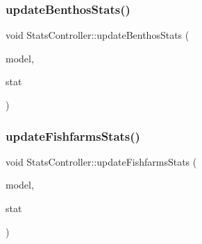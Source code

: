\mbox{\label{class_stats_controller_ab43599a0bbe242b5e4bc4bc3edaeaf58}} 
\subsubsection{\texorpdfstring{updateBenthosStats()}{updateBenthosStats()}}
{\footnotesize\ttfamily void Stats\+Controller\+::update\+Benthos\+Stats (\begin{DoxyParamCaption}\item[{\mbox{\hyperlink{class_displace_model}{Displace\+Model}} $\ast$}]{model,  }\item[{\mbox{\hyperlink{namespacedisplace_1_1plot_a3a91ceda6f3e5855d0e7cf97e8dea045}{displace\+::plot\+::\+Benthos\+Stat}}}]{stat }\end{DoxyParamCaption})\hspace{0.3cm}{\ttfamily [protected]}}

\mbox{\label{class_stats_controller_ac6ff97444b410e47285eb46764af6026}} 
\subsubsection{\texorpdfstring{updateFishfarmsStats()}{updateFishfarmsStats()}}
{\footnotesize\ttfamily void Stats\+Controller\+::update\+Fishfarms\+Stats (\begin{DoxyParamCaption}\item[{\mbox{\hyperlink{class_displace_model}{Displace\+Model}} $\ast$}]{model,  }\item[{\mbox{\hyperlink{namespacedisplace_1_1plot_a4746af73ffe0625cf87b8fb07fd5bfa4}{displace\+::plot\+::\+Fishfarms\+Stat}}}]{stat }\end{DoxyParamCaption})\hspace{0.3cm}{\ttfamily [protected]}}

\mbox{\label{class_stats_controller_a9a74daa06e526a0153e1c724ac50039b}} 
